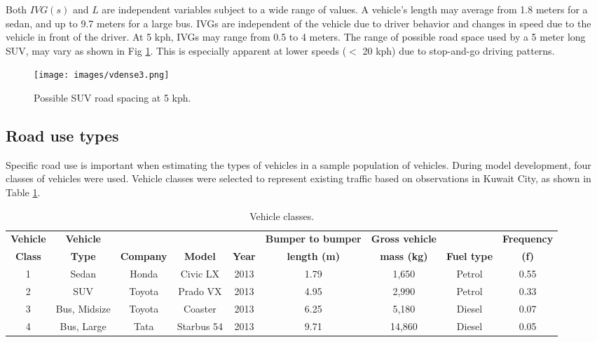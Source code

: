 Both $IVG(s)$ and $L$ are independent variables subject to a wide range of values.  A vehicle’s length may average from 1.8 meters for a sedan, and up to 9.7 meters for a large bus.  IVGs are independent of the vehicle due to driver behavior and changes in speed due to the vehicle in front of the driver.  At 5 kph, IVGs may range from 0.5 to 4 meters.  The range of possible road space used by a 5 meter long SUV, may vary as shown in Fig \ref{fig3:SUVspace}.  This is especially apparent at lower speeds ($<$ 20 kph) due to stop-and-go driving patterns.  

%
\begin{figure}
\texttt{[image: images/vdense3.png]} 
\caption{Possible SUV road spacing at 5 kph.}
\label{fig3:SUVspace}
\end{figure}
%
\subsection{Road use types}
Specific road use is important when estimating the types of vehicles in a sample population of vehicles.  During model development, four classes of vehicles were used.  Vehicle classes were selected to represent existing traffic based on observations in Kuwait City, as shown in Table \ref{tb1:vehicletypes}.

\begin{table}[]
\centering
\caption{Vehicle classes.}
\label{tb1:vehicletypes}
\begin{tabular}{@{}ccccccccc@{}}
\toprule
\textbf{Vehicle} & \textbf{Vehicle} & \textbf{} & \textbf{} & \textbf{} & \textbf{Bumper to bumper} & \textbf{Gross vehicle} & \textbf{} & \textbf{Frequency} \\ 
\textbf{Class} & \textbf{Type} & \textbf{Company} & \textbf{Model} & \textbf{Year} & \textbf{length (m)} & \textbf{mass (kg)} & \textbf{Fuel type} & \textbf{(f)} \\ \midrule
1 & Sedan & Honda & Civic LX & 2013 & 1.79 & 1,650 & Petrol & 0.55 \\
2 & SUV & Toyota & Prado VX & 2013 & 4.95 & 2,990 & Petrol & 0.33 \\
3 & Bus, Midsize & Toyota & Coaster & 2013 & 6.25 & 5,180 & Diesel & 0.07 \\
4 & Bus, Large & Tata & Starbus 54 & 2013 & 9.71 & 14,860 & Diesel & 0.05 \\ \bottomrule
\end{tabular}
\end{table}

